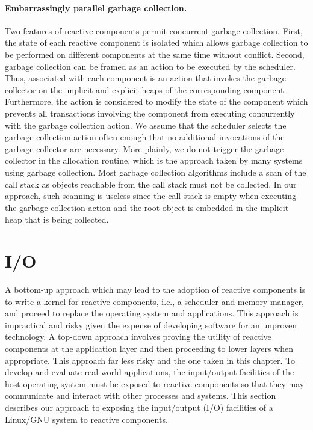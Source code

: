 \paragraph{Embarrassingly parallel garbage collection.}
Two features of reactive components permit concurrent garbage collection.
First, the state of each reactive component is isolated which allows garbage collection to be performed on different components at the same time without conflict.
Second, garbage collection can be framed as an action to be executed by the scheduler.
Thus, associated with each component is an action that invokes the garbage collector on the implicit and explicit heaps of the corresponding component.
Furthermore, the action is considered to modify the state of the component which prevents all transactions involving the component from executing concurrently with the garbage collection action.
We assume that the scheduler selects the garbage collection action often enough that no additional invocations of the garbage collector are necessary.
More plainly, we do not trigger the garbage collector in the allocation routine, which is the approach taken by many systems using garbage collection.
Most garbage collection algorithms include a scan of the call stack as objects reachable from the call stack must not be collected.
In our approach, such scanning is useless since the call stack is empty when executing the garbage collection action and the root object is embedded in the implicit heap that is being collected.

\section{I/O}

A bottom-up approach which may lead to the adoption of reactive components is to write a kernel for reactive components, i.e., a scheduler and memory manager, and proceed to replace the operating system and applications.
This approach is impractical and risky given the expense of developing software for an unproven technology.
A top-down approach involves proving the utility of reactive components at the application layer and then proceeding to lower layers when appropriate.
This approach far less risky and the one taken in this chapter.
To develop and evaluate real-world applications, the input/output facilities of the host operating system must be exposed to reactive components so that they may communicate and interact with other processes and systems.
This section describes our approach to exposing the input/output (I/O) facilities of a Linux/GNU system to reactive components.

